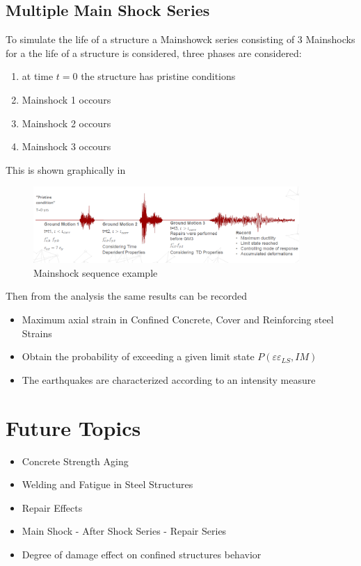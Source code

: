 \subsection{Multiple Main Shock Series}

To simulate the life of a structure a Mainshowck series consisting of 3 Mainshocks for a the life of a structure is considered, three phases are considered:
\begin{enumerate}

	\item at time $t=0$ the structure has pristine conditions
	\item Mainshock 1 occours
	\item Mainshock 2 occours
	\item Mainshock 3 occours
\end{enumerate}

This is shown graphically in 

\begin{figure}[htbp]
	\centering
	\includegraphics[width=0.9\textwidth]{Chapter-4/figs/MainShock_Sequence}
	\caption{Mainshock sequence example}
	\label{fig:MSSequence}
\end{figure}


Then from the analysis the same results can be recorded

\begin{itemize}
	\item Maximum axial strain in Confined Concrete, Cover and Reinforcing steel 
Strains
	\item Obtain the probability of exceeding a given limit state $P(\varepsilon\varepsilon_{LS},IM)$
	\item The earthquakes are characterized according to an intensity measure

\end{itemize}

\section{Future Topics}

\begin{itemize}
	\item Concrete Strength Aging
	\item Welding and Fatigue in Steel Structures
	\item Repair Effects
	\item Main Shock - After Shock Series - Repair Series
	\item Degree of damage effect on confined structures behavior
\end{itemize}

